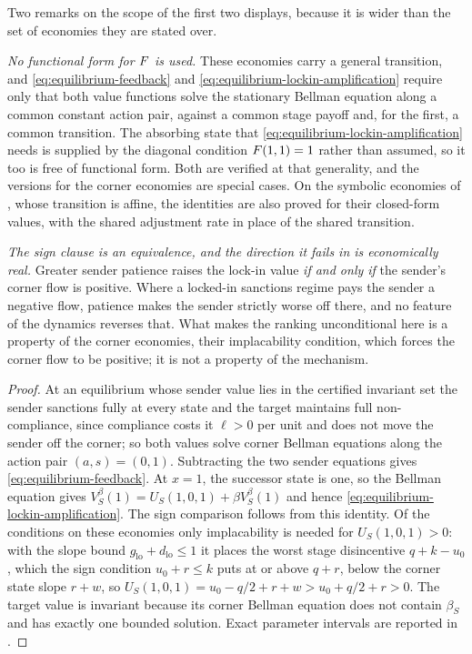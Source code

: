 Two remarks on the scope of the first two displays, because it is wider than the
set of economies they are stated over.

\emph{No functional form for $F$ is used.}  These economies carry a general
transition, and \eqref{eq:equilibrium-feedback} and
\eqref{eq:equilibrium-lockin-amplification} require only that both value
functions solve the stationary Bellman equation along a common constant action
pair, against a common stage payoff and, for the first, a common transition. The
absorbing state that \eqref{eq:equilibrium-lockin-amplification} needs is
supplied by the diagonal condition $F(1,1)=1$ rather than assumed, so it too is
free of functional form. Both are verified at that generality, and the versions for the corner
economies are special cases. On the symbolic economies of , whose transition is affine,
the identities are also proved for their closed-form values, with the shared
adjustment rate in place of the shared transition.

\emph{The sign clause is an equivalence, and the direction it fails in is
economically real.}  Greater sender patience raises the lock-in value \emph{if
and only if} the sender's corner flow is positive. Where a locked-in sanctions regime pays
the sender a negative flow, patience makes the sender strictly worse off there,
and no feature of the dynamics reverses that. What makes the ranking
unconditional here is a property of the corner economies, their implacability condition, which
forces the corner flow to be positive; it is not a property of the mechanism.

\begin{proof}
At an equilibrium whose sender value lies in the certified invariant set the sender
sanctions fully at every state and the target maintains full non-compliance, since compliance
costs it $\ell>0$ per unit and does not move the sender off the corner; so both
values solve corner Bellman equations along the action pair $(a,s)=(0,1)$.
Subtracting the two sender equations gives \eqref{eq:equilibrium-feedback}. At
$x=1$, the successor state is one,
so the Bellman equation gives
$V_S^{\beta}(1)=U_S(1,0,1)+\beta V_S^{\beta}(1)$ and hence
\eqref{eq:equilibrium-lockin-amplification}. The sign comparison follows
from this identity. Of the conditions on these economies only implacability is needed for
$U_S(1,0,1)>0$: with the slope bound $g_{\mathrm{lo}}+d_{\mathrm{lo}}\le1$ it
places the worst stage disincentive $q+k-u_0$, which the sign condition
$u_0+r\le k$ puts at or above $q+r$, below the corner state slope $r+w$, so
$U_S(1,0,1)=u_0-q/2+r+w>u_0+q/2+r>0$. The target value is
invariant because its corner Bellman equation does not contain $\beta_S$ and has
exactly one bounded solution. Exact parameter
intervals are reported in .
\end{proof}

